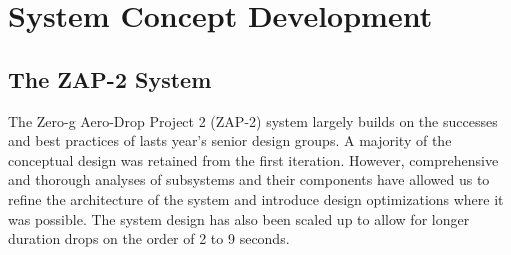 \section{\label{sys_concept_dev}System Concept Development}

\subsection{The ZAP-2 System}

\indent\indent The Zero-g Aero-Drop Project 2 (ZAP-2) system largely builds on the successes and best practices of lasts year's senior design groups. A majority of the conceptual design was retained from the first iteration. However, comprehensive and thorough analyses of subsystems and their components have allowed us to refine the architecture of the system and introduce design optimizations where it was possible. The system design has also been scaled up to allow for longer duration drops on the order of 2 to 9 seconds.

